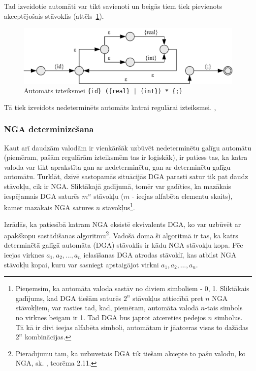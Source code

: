 Tad izveidotie automāti var tikt savienoti un beigās tiem tiek pievienots akceptējošais stāvoklis (attēls~\ref{fig:auto_full_ex}).

\begin{figure}[H]
  \centering
    \includegraphics[scale=1.25]{pictures/auto_full_ex}
  \caption{\label{fig:auto_full_ex}Automāts izteiksmei \texttt{\{id\} (\{real\} | \{int\}) * \{;\}}}
\end{figure}

Tā tiek izveidots nedeterminēts automāts katrai regulārai izteiksmei. \cite{Cox:RegexpMatchingFast}, \cite{DragonBook}

\subsubsection{NGA determinizēšana}

Kaut arī daudzām valodām ir vienkāršāk uzbūvēt nedeterminētu galīgu automātu (piemēram, pašām regulārām izteiksmēm tas ir loģiskāk), ir patiess tas, ka katra valoda var tikt aprakstīta gan ar nedeterminētu, gan ar determinētu galīgu automātu. Turklāt, dzīvē sastopamās situācijās DGA parasti satur tik pat daudz stāvokļu, cik ir NGA. Sliktākajā gadījumā, tomēr var gadīties, ka mazākais iespējamais DGA saturēs $m^n$ stāvokļu ($m$ - ieejas alfabēta elementu skaits), kamēr mazākais NGA saturēs $n$ stāvokļus\footnote{Pieņemsim, ka automāta valoda sastāv no diviem simboliem - {0, 1}. Sliktākais gadījums, kad DGA tiešām saturēs $2^n$ stāvokļus attiecībā pret $n$ NGA stāvokļiem, var rasties tad, kad, piemēram, automāta valodā $n$-tais simbols no virknes beigām ir 1. Tad DGA būs jāprot atcerēties pēdējos $n$ simbolus. Tā kā ir divi ieejas alfabēta simboli, automātam ir jāatceras visas to dažādas $2^n$ kombinācijas.}.

Izrādās, ka patiesībā katram NGA eksistē ekvivalents DGA, ko var uzbūvēt ar apakškopu sastādīšanas algoritmu\footnote{Pierādījumu tam, ka uzbūvētais DGA tik tiešām akceptē to pašu valodu, ko NGA, sk.  \cite{Hopcroft:IntroAutomataTheory}, teorēma 2.11.}. Vadošā doma šī algoritmā ir tas, ka katrs determinētā galīgā automāta (DGA) stāvoklis ir kādu NGA stāvokļu kopa. Pēc ieejas virknes $a_1, a_2, ..., a_n$ ielasīšanas DGA atrodas stāvoklī, kas atbilst NGA stāvokļu kopai, kuru var sasniegt apstaigājot virkni $a_1, a_2, ..., a_n$.

